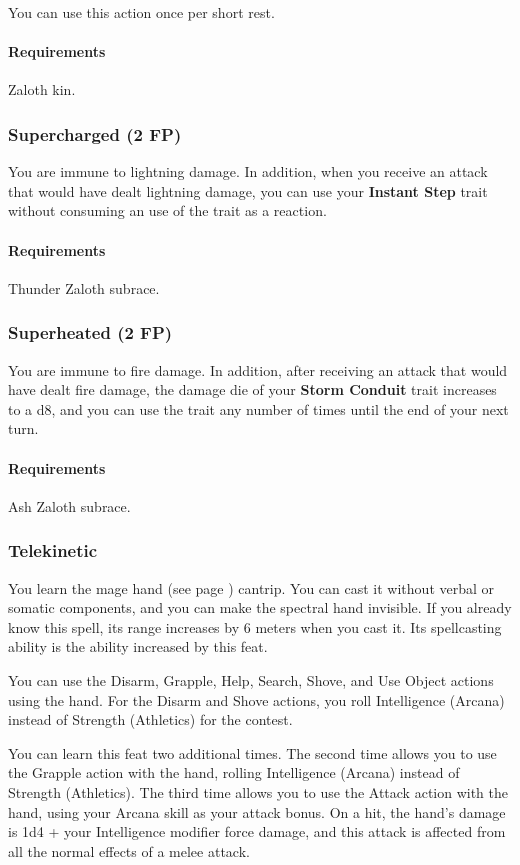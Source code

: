         You can use this action once per short rest.
        \paragraph{Requirements} Zaloth kin.
    \subsubsection{Supercharged (2 FP)} \label{feat::supercharged}
        You are immune to lightning damage.
        In addition, when you receive an attack that would have dealt lightning damage, you can use your \textbf{Instant Step} trait without consuming an use of the trait as a reaction.
        \paragraph{Requirements} Thunder Zaloth subrace.
    \subsubsection{Superheated (2 FP)} \label{feat::superheated}
        You are immune to fire damage.
        In addition, after receiving an attack that would have dealt fire damage, the damage die of your \textbf{Storm Conduit} trait increases to a d8, and you can use the trait any number of times until the end of your next turn.
        \paragraph{Requirements} Ash Zaloth subrace.
    \subsubsection{Telekinetic} \label{feat::telekinetic}
        You learn the mage hand (see page \pageref{spell::magehand}) cantrip.
        You can cast it without verbal or somatic components, and you can make the spectral hand invisible.
        If you already know this spell, its range increases by 6 meters when you cast it.
        Its spellcasting ability is the ability increased by this feat.

        You can use the Disarm, Grapple, Help, Search, Shove, and Use Object actions using the hand.
        For the Disarm and Shove actions, you roll Intelligence (Arcana) instead of Strength (Athletics) for the contest.

        You can learn this feat two additional times.
        The second time allows you to use the Grapple action with the hand, rolling Intelligence (Arcana) instead of Strength (Athletics).
        The third time allows you to use the Attack action with the hand, using your Arcana skill as your attack bonus.
        On a hit, the hand's damage is 1d4 + your Intelligence modifier force damage, and this attack is affected from all the normal effects of a melee attack.
